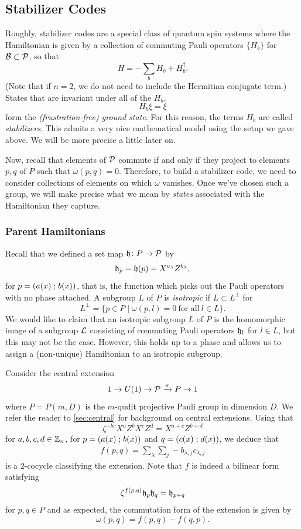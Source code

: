 \documentclass[11pt]{amsart}
\begin{document}
\subsection{Stabilizer Codes}

Roughly, stabilizer codes are a special class of quantum spin systems where the Hamiltonian is given by a collection of commuting Pauli operators $\{H_b\}$ for $\mathcal{B} \subset \mathcal{P}$, so that
\[H =- \sum_{b} H_b+H_b^\dagger.\]
(Note that if $n=2$, we do not need to include the Hermitian conjugate term.)
States that are invariant under all of the $H_b$,
\[ H_b \xi = \xi \]
form the \emph{(frustration-free) ground state}. For this reason, the terms $H_b$ are called \emph{stabilizers}. This admits a very nice mathematical model using the setup we gave above. We will be more precise a little later on.

Now, recall that elements of $\mathcal{P}$ commute if and only if they project to elements $p,q$ of $P$ such that $\omega(p,q)=0$.  Therefore, to build a stabilizer code, we need to consider collections of elements on which $\omega$ vanishes. Once we've chosen such a group, we will make precise what we mean by \emph{states} associated with the Hamiltonian they capture.

\subsubsection{Parent Hamiltonians}


Recall that we defined a set map $\mathfrak{h} \colon P \to \mathcal{P}$ by
\[\mathfrak{h}_p = \mathfrak{h}(p) = X^{a_\lambda}Z^{b_\lambda}, \]
for $p=(a(x) \mathrel{;} b(x))$, that is, the function which picks out the Pauli operators with no phase attached.
A subgroup $L$ of $P$ is \emph{isotropic} if $L\subset L^\perp$ for
\[L^\perp = \{ p \in P \mid \omega(p,l)=0 \ \text{for all} \ l\in L\}.\]
We would like to claim that an isotropic subgroup $L$ of $P$ is the homomorphic image of a subgroup $\mathcal{L}$ consisting of commuting Pauli operators $\mathfrak{h}_l$ for $l\in L$, but this may not be the case. However, this holds up to a phase and allows us to assign a (non-unique) Hamiltonian to an isotropic subgroup.

Consider the central extension
\[1 \to U(1) \to \mathcal{P} \xrightarrow{\pi} P \to 1\]
where $P = P(m,D)$ is the $m$-qudit projective Pauli group in dimension $D$.  We refer the reader to \cref{sec:central} for background on central extensions.
Using that
\[ \zeta^{-bc} X^aZ^b X^c Z^d = X^{a+c}Z^{b+d}\]
for $a,b,c,d\in \mathbb{Z}_n$,
for $p = (a(x) \mathrel{;} b(x))$ and $q=(c(x) \mathrel{;} d(x))$, we deduce that
\begin{align}\label{ex:fPauli}
f(p,q) = \sum_\lambda \sum_{j} -b_{\lambda,j}c_{\lambda,j}
\end{align}
 is a 2-cocycle classifying the extension.
Note that $f$ is indeed a bilinear form satisfying
\[ \zeta^{f(p,q)}\mathfrak{h}_p\mathfrak{h}_q=\mathfrak{h}_{p+q}\]
for $p,q\in P$ and as expected, the commutation form of the extension is given by
\[\omega(p,q) = f(p,q)-f(q,p).\]
\end{document}
